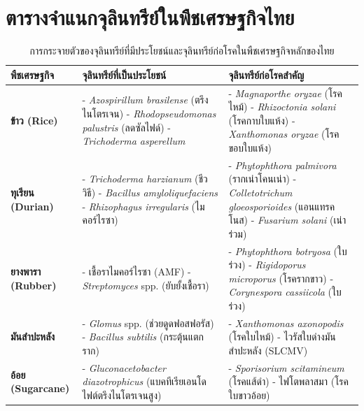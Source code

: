 \chapter{ตารางจำแนกจุลินทรีย์ในพืชเศรษฐกิจไทย}
\label{app:economic_crops}

\begin{table}[H]
\centering
\small
\begin{tabularx}{\textwidth}{|p{2.6cm}|X|X|}
\hline
\rowcolor{agriMint}
\textbf{พืชเศรษฐกิจ} & \textbf{จุลินทรีย์ที่เป็นประโยชน์} & \textbf{จุลินทรีย์ก่อโรคสำคัญ} \\ \hline
\textbf{ข้าว (Rice)} & 
- \textit{Azospirillum brasilense} (ตรึงไนโตรเจน)\newline
- \textit{Rhodopseudomonas palustris} (ลดซัลไฟด์)\newline
- \textit{Trichoderma asperellum} & 
- \textit{Magnaporthe oryzae} (โรคไหม้)\newline
- \textit{Rhizoctonia solani} (โรคกาบใบแห้ง)\newline
- \textit{Xanthomonas oryzae} (โรคขอบใบแห้ง) \\ \hline

\textbf{ทุเรียน (Durian)} & 
- \textit{Trichoderma harzianum} (ชีววิธี)\newline
- \textit{Bacillus amyloliquefaciens}\newline
- \textit{Rhizophagus irregularis} (ไมคอร์ไรซา) & 
- \textit{Phytophthora palmivora} (รากเน่าโคนเน่า)\newline
- \textit{Colletotrichum gloeosporioides} (แอนแทรคโนส)\newline
- \textit{Fusarium solani} (เน่าร่วม) \\ \hline

\textbf{ยางพารา (Rubber)} & 
- เชื้อราไมคอร์ไรซา (AMF)\newline
- \textit{Streptomyces} spp. (ยับยั้งเชื้อรา) & 
- \textit{Phytophthora botryosa} (ใบร่วง)\newline
- \textit{Rigidoporus microporus} (โรครากขาว)\newline
- \textit{Corynespora cassiicola} (ใบร่วง) \\ \hline

\textbf{มันสำปะหลัง} & 
- \textit{Glomus} spp. (ช่วยดูดฟอสฟอรัส)\newline
- \textit{Bacillus subtilis} (กระตุ้นแตกราก) & 
- \textit{Xanthomonas axonopodis} (โรคใบไหม้)\newline
- ไวรัสใบด่างมันสำปะหลัง (SLCMV) \\ \hline

\textbf{อ้อย (Sugarcane)} & 
- \textit{Gluconacetobacter diazotrophicus}\newline
  (แบคทีเรียเอนโดไฟต์ตรึงไนโตรเจนสูง) & 
- \textit{Sporisorium scitamineum} (โรคแส้ดำ)\newline
- ไฟโตพลาสมา (โรคใบขาวอ้อย) \\ \hline
\end{tabularx}
\caption{การกระจายตัวของจุลินทรีย์ที่มีประโยชน์และจุลินทรีย์ก่อโรคในพืชเศรษฐกิจหลักของไทย}
\label{tab:crop_microbes}
\end{table}

\clearpage